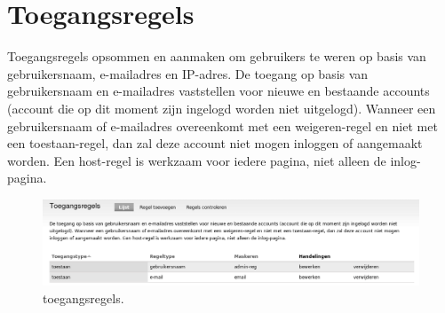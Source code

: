 \section{Toegangsregels} 
    Toegangsregels opsommen en aanmaken om gebruikers te weren op basis van gebruikersnaam, e-mailadres en IP-adres.
De toegang op basis van gebruikersnaam en e-mailadres vaststellen voor nieuwe en
bestaande accounts  (account die op dit moment zijn ingelogd
worden niet uitgelogd). Wanneer een gebruikersnaam of e-mailadres overeenkomt met een weigeren-regel en niet met een toestaan-regel, dan zal deze account niet 
mogen inloggen of aangemaakt worden. Een host-regel is werkzaam voor iedere pagina, niet alleen de inlog-pagina.
\begin{figure}[!h]
    \centering
   \includegraphics[scale=0.3,angle=0]{toegangsregels}
   \caption{toegangsregels.\label{white}}
 \end{figure}